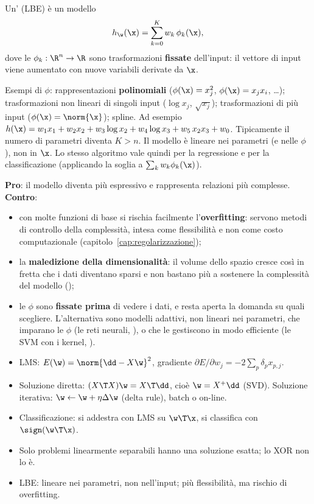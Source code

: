 \begin{definizione}
Un' (LBE) è un modello
\[
h_\w(\x) = \sum_{k=0}^{K}w_k\,\phi_k(\x),
\]
dove le $\phi_k:\R^n\to\R$ sono trasformazioni \textbf{fissate} dell'input: il vettore di input viene aumentato
con nuove variabili derivate da $\x$.
\end{definizione}

Esempi di $\phi$: rappresentazioni \textbf{polinomiali} ($\phi(\x)=x_j^2$, $\phi(\x)=x_jx_i$, \dots);
trasformazioni non lineari di singoli input ($\log x_j$, $\sqrt{x_j}$); trasformazioni di più input
($\phi(\x) = \norm{\x}$); spline. Ad esempio
$h(\x) = w_1x_1+w_2x_2+w_3\log x_2+w_4\log x_3+w_5\,x_2x_3+w_0$. Tipicamente il numero di parametri diventa
$K>n$. Il modello è lineare nei parametri (e nelle $\phi$), non in $\x$. Lo stesso algoritmo vale quindi per la
regressione e per la classificazione (applicando la soglia a $\sum_kw_k\phi_k(\x)$).

\begin{attenzione}
\textbf{Pro}: il modello diventa più espressivo e rappresenta relazioni più complesse.\\
\textbf{Contro}:
\begin{itemize}
  \item con molte funzioni di base si rischia facilmente l'\textbf{overfitting}: servono metodi di controllo
        della complessità, intesa come flessibilità e non come costo computazionale
        (capitolo~\ref{cap:regolarizzazione});
  \item la \textbf{maledizione della dimensionalità}: il volume dello spazio cresce così in fretta che i dati
        diventano sparsi e non bastano più a sostenere la complessità del modello ();
  \item le $\phi$ sono \textbf{fissate prima} di vedere i dati, e resta aperta la domanda su quali scegliere.
        L'alternativa sono modelli adattivi, non lineari nei parametri, che imparano le $\phi$ (le reti neurali,
        ), o che le gestiscono in modo efficiente (le SVM con i kernel, ).
\end{itemize}
\end{attenzione}

\begin{puntichiave}
\begin{itemize}
  \item LMS: $E(\w)=\norm{\dd-X\w}^2$, gradiente $\partial E/\partial w_j = -2\sum_p\delta_px_{p,j}$.
  \item Soluzione diretta: $(X\T X)\w = X\T\dd$, cioè $\w=X^+\dd$ (SVD). Soluzione iterativa:
        $\w\leftarrow\w+\eta\Delta\w$ (delta rule), batch o on-line.
  \item Classificazione: si addestra con LMS su $\w\T\x$, si classifica con $\sign(\w\T\x)$.
  \item Solo problemi linearmente separabili hanno una soluzione esatta; lo XOR non lo è.
  \item LBE: lineare nei parametri, non nell'input; più flessibilità, ma rischio di overfitting.
\end{itemize}
\end{puntichiave}

